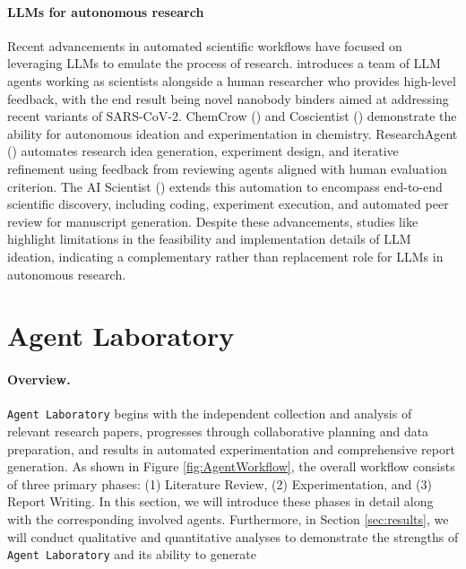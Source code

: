 \documentclass[11pt, a4paper]{gdm_format}
\begin{document}
\paragraph{LLMs for autonomous research}

Recent advancements in automated scientific workflows have focused on leveraging LLMs to emulate the process of research. \cite{swanson2024virtual} introduces a team of LLM agents working as scientists alongside a human researcher who provides high-level feedback, with the end result being novel nanobody binders aimed at addressing recent variants of SARS-CoV-2. ChemCrow (\cite{ m2024augmenting}) and Coscientist (\cite{boiko2023autonomous}) demonstrate the ability for autonomous ideation and experimentation in chemistry. ResearchAgent (\cite{baek2024researchagent}) automates research idea generation, experiment design, and iterative refinement using feedback from reviewing agents aligned with human evaluation criterion. The AI Scientist (\cite{lu2024ai}) extends this automation to encompass end-to-end scientific discovery, including coding, experiment execution, and automated peer review for manuscript generation. Despite these advancements, studies like \cite{si2024can} highlight limitations in the feasibility and implementation details of LLM ideation, indicating a complementary rather than replacement role for LLMs in autonomous research. 


\section{Agent Laboratory}

\paragraph{Overview.} \texttt{Agent Laboratory} begins with the independent collection and analysis of relevant research papers, progresses through collaborative planning and data preparation, and results in automated experimentation and comprehensive report generation. 
As shown in Figure \ref{fig:AgentWorkflow}, the overall workflow consists of three primary phases: (1) Literature Review, (2) Experimentation, and (3) Report Writing. 
In this section, we will introduce these phases in detail along with the corresponding involved agents.
Furthermore, in Section \ref{sec:results}, we will conduct qualitative and quantitative analyses to demonstrate the strengths of \texttt{Agent Laboratory} and its ability to generate
\end{document}
